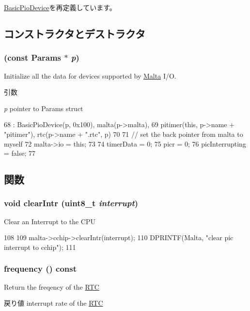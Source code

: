 \hyperlink{classBasicPioDevice_a2845515ac6467f10540747053c8a0449}{BasicPioDevice}を再定義しています。

\subsection{コンストラクタとデストラクタ}
\hypertarget{classMaltaIO_a4a44a2fd97be4aa558dcc9c5751df3bc}{
\subsubsection[{MaltaIO}]{ (const {\bf Params} $\ast$ {\em p})}}
\label{classMaltaIO_a4a44a2fd97be4aa558dcc9c5751df3bc}
Initialize all the data for devices supported by \hyperlink{classMalta}{Malta} I/O. 
\begin{DoxyParams}{引数}
\item[{\em p}]pointer to Params struct \end{DoxyParams}



\begin{DoxyCode}
68     : BasicPioDevice(p, 0x100), malta(p->malta),
69       pitimer(this, p->name + "pitimer"), rtc(p->name + ".rtc", p)
70 {
71     // set the back pointer from malta to myself
72     malta->io = this;
73 
74     timerData = 0;
75     picr = 0;
76     picInterrupting = false;
77 }
\end{DoxyCode}


\subsection{関数}
\hypertarget{classMaltaIO_ae777549b457b25efd35a47f13974f2e1}{
\subsubsection[{clearIntr}]{\setlength{\rightskip}{0pt plus 5cm}void clearIntr (uint8\_\-t {\em interrupt})}}
\label{classMaltaIO_ae777549b457b25efd35a47f13974f2e1}
Clear an Interrupt to the CPU 


\begin{DoxyCode}
108 {
109     malta->cchip->clearIntr(interrupt);
110     DPRINTF(Malta, "clear pic interrupt to cchip\n");
111 }
\end{DoxyCode}
\hypertarget{classMaltaIO_ae7d31c6aab76d9d4e74e5e7227337651}{
\subsubsection[{frequency}]{ frequency () const}}
\label{classMaltaIO_ae7d31c6aab76d9d4e74e5e7227337651}
Return the freqency of the \hyperlink{classMaltaIO_1_1RTC}{RTC} \begin{DoxyReturn}{戻り値}
interrupt rate of the \hyperlink{classMaltaIO_1_1RTC}{RTC} 
\end{DoxyReturn}


